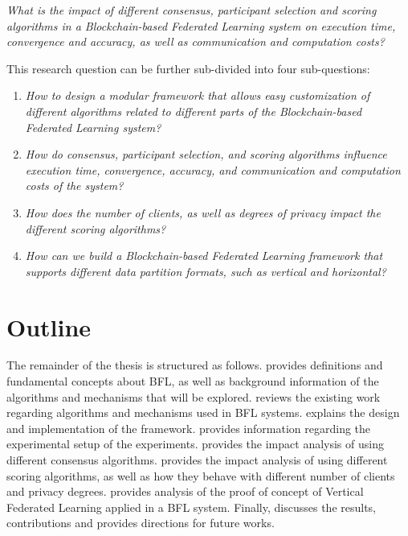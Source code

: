 \begin{center}
    \textit{What is the impact of different consensus, participant selection and scoring algorithms in a Blockchain-based Federated Learning system on execution time, convergence and accuracy, as well as communication and computation costs?}
\end{center}

This research question can be further sub-divided into four sub-questions:

\begin{enumerate}
    \item \textit{How to design a modular framework that allows easy customization of different algorithms related to different parts of the Blockchain-based Federated Learning system?}
    
    \item \textit{How do consensus, participant selection, and scoring algorithms influence execution time, convergence, accuracy, and communication and computation costs of the system?}
    
    \item \textit{How does the number of clients, as well as degrees of privacy impact the different scoring algorithms?}
    
    \item \textit{How can we build a Blockchain-based Federated Learning framework that supports different data partition formats, such as vertical and horizontal?}
\end{enumerate}

\section{Outline}\label{intro:outline}

The remainder of the thesis is structured as follows.  provides definitions and fundamental concepts about BFL, as well as background information of the algorithms and mechanisms that will be explored.  reviews the existing work regarding algorithms and mechanisms used in BFL systems.  explains the design and implementation of the framework.  provides information regarding the experimental setup of the experiments.  provides the impact analysis of using different consensus algorithms.  provides the impact analysis of using different scoring algorithms, as well as how they behave with different number of clients and privacy degrees.  provides analysis of the proof of concept of Vertical Federated Learning applied in a BFL system. Finally,  discusses the results, contributions and provides directions for future works.

